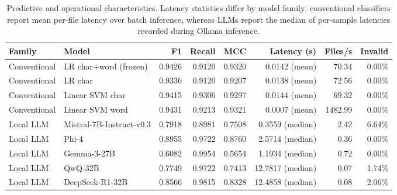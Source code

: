 \begin{table}[t]
\centering
\caption{Predictive and operational characteristics. Latency statistics differ by model family: conventional classifiers report mean per-file latency over batch inference, whereas LLMs report the median of per-sample latencies recorded during Ollama inference.}
\label{tab:operational}
\small
\begin{tabular}{llrrrrrr}
\toprule
Family & Model & F1 & Recall & MCC & Latency (s) & Files/s & Invalid \\
\midrule
Conventional & LR char+word (frozen) & 0.9426 & 0.9120 & 0.9320 & 0.0142 (mean) & 70.34 & 0.00\% \\
Conventional & LR char & 0.9336 & 0.9120 & 0.9207 & 0.0138 (mean) & 72.56 & 0.00\% \\
Conventional & Linear SVM char & 0.9415 & 0.9306 & 0.9297 & 0.0144 (mean) & 69.32 & 0.00\% \\
Conventional & Linear SVM word & 0.9431 & 0.9213 & 0.9321 & 0.0007 (mean) & 1482.99 & 0.00\% \\
\midrule
Local LLM & Mistral-7B-Instruct-v0.3 & 0.7918 & 0.8981 & 0.7508 & 0.3559 (median) & 2.42 & 6.64\% \\
Local LLM & Phi-4 & 0.8955 & 0.9722 & 0.8760 & 2.5714 (median) & 0.36 & 0.00\% \\
Local LLM & Gemma-3-27B & 0.6082 & 0.9954 & 0.5654 & 1.1934 (median) & 0.72 & 0.00\% \\
Local LLM & QwQ-32B & 0.7749 & 0.9722 & 0.7413 & 12.7817 (median) & 0.07 & 1.74\% \\
Local LLM & DeepSeek-R1-32B & 0.8566 & 0.9815 & 0.8328 & 12.4858 (median) & 0.08 & 2.06\% \\
\bottomrule
\end{tabular}
\end{table}
